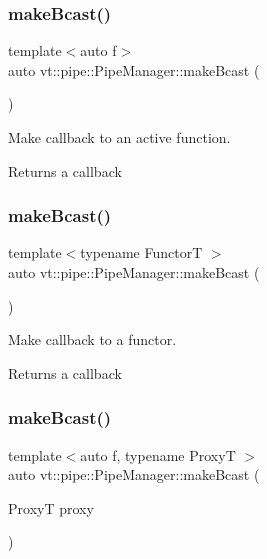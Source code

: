 \subsubsection{\texorpdfstring{make\+Bcast()}{makeBcast()}\hspace{0.1cm}{\footnotesize\ttfamily [1/7]}}
{\footnotesize\ttfamily template$<$auto f$>$ \\
auto vt\+::pipe\+::\+Pipe\+Manager\+::make\+Bcast (\begin{DoxyParamCaption}{ }\end{DoxyParamCaption})}



Make callback to an active function. 

\begin{DoxyReturn}{Returns}
a callback 
\end{DoxyReturn}
\mbox{\label{structvt_1_1pipe_1_1_pipe_manager_a5b124c9c765e8b3bb9aca1b367e45db2}} 
\subsubsection{\texorpdfstring{make\+Bcast()}{makeBcast()}\hspace{0.1cm}{\footnotesize\ttfamily [2/7]}}
{\footnotesize\ttfamily template$<$typename FunctorT $>$ \\
auto vt\+::pipe\+::\+Pipe\+Manager\+::make\+Bcast (\begin{DoxyParamCaption}{ }\end{DoxyParamCaption})}



Make callback to a functor. 

\begin{DoxyReturn}{Returns}
a callback 
\end{DoxyReturn}
\mbox{\label{structvt_1_1pipe_1_1_pipe_manager_a504f13120e6869619d2128208405fbc4}} 
\subsubsection{\texorpdfstring{make\+Bcast()}{makeBcast()}\hspace{0.1cm}{\footnotesize\ttfamily [3/7]}}
{\footnotesize\ttfamily template$<$auto f, typename ProxyT $>$ \\
auto vt\+::pipe\+::\+Pipe\+Manager\+::make\+Bcast (\begin{DoxyParamCaption}\item[{ProxyT}]{proxy }\end{DoxyParamCaption})}



